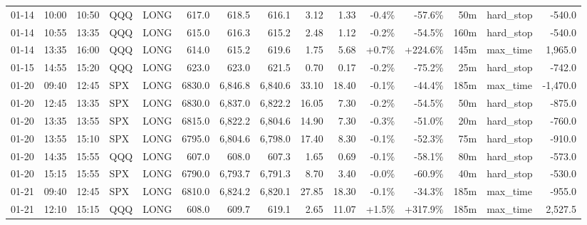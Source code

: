 \documentclass[11pt,a4paper,twoside]{article}
\begin{document}
\begin{landscape}
\begin{center}
\begin{longtable}{>{\color{txtmain}}l l l l l r r r r r r r r >{\color{txtmain}}l r}
01-14 & 10:00 & 10:50 & QQQ & LONG & 617.0 & 618.5 & 616.1 & 3.12 & 1.33 & \textcolor{lossred}{-0.4\%} & \textcolor{lossred}{-57.6\%} & 50m & hard\_stop & \textcolor{lossred}{-540.0} \\
01-14 & 10:55 & 13:35 & QQQ & LONG & 615.0 & 616.3 & 615.2 & 2.48 & 1.12 & \textcolor{lossred}{-0.2\%} & \textcolor{lossred}{-54.5\%} & 160m & hard\_stop & \textcolor{lossred}{-540.0} \\
01-14 & 13:35 & 16:00 & QQQ & LONG & 614.0 & 615.2 & 619.6 & 1.75 & 5.68 & \textcolor{wingreen}{+0.7\%} & \textcolor{wingreen}{+224.6\%} & 145m & max\_time & \textcolor{wingreen}{1,965.0} \\
01-15 & 14:55 & 15:20 & QQQ & LONG & 623.0 & 623.0 & 621.5 & 0.70 & 0.17 & \textcolor{lossred}{-0.2\%} & \textcolor{lossred}{-75.2\%} & 25m & hard\_stop & \textcolor{lossred}{-742.0} \\
01-20 & 09:40 & 12:45 & SPX & LONG & 6830.0 & 6,846.8 & 6,840.6 & 33.10 & 18.40 & \textcolor{lossred}{-0.1\%} & \textcolor{lossred}{-44.4\%} & 185m & max\_time & \textcolor{lossred}{-1,470.0} \\
01-20 & 12:45 & 13:35 & SPX & LONG & 6830.0 & 6,837.0 & 6,822.2 & 16.05 & 7.30 & \textcolor{lossred}{-0.2\%} & \textcolor{lossred}{-54.5\%} & 50m & hard\_stop & \textcolor{lossred}{-875.0} \\
01-20 & 13:35 & 13:55 & SPX & LONG & 6815.0 & 6,822.2 & 6,804.6 & 14.90 & 7.30 & \textcolor{lossred}{-0.3\%} & \textcolor{lossred}{-51.0\%} & 20m & hard\_stop & \textcolor{lossred}{-760.0} \\
01-20 & 13:55 & 15:10 & SPX & LONG & 6795.0 & 6,804.6 & 6,798.0 & 17.40 & 8.30 & \textcolor{lossred}{-0.1\%} & \textcolor{lossred}{-52.3\%} & 75m & hard\_stop & \textcolor{lossred}{-910.0} \\
01-20 & 14:35 & 15:55 & QQQ & LONG & 607.0 & 608.0 & 607.3 & 1.65 & 0.69 & \textcolor{lossred}{-0.1\%} & \textcolor{lossred}{-58.1\%} & 80m & hard\_stop & \textcolor{lossred}{-573.0} \\
01-20 & 15:15 & 15:55 & SPX & LONG & 6790.0 & 6,793.7 & 6,791.3 & 8.70 & 3.40 & \textcolor{lossred}{-0.0\%} & \textcolor{lossred}{-60.9\%} & 40m & hard\_stop & \textcolor{lossred}{-530.0} \\
01-21 & 09:40 & 12:45 & SPX & LONG & 6810.0 & 6,824.2 & 6,820.1 & 27.85 & 18.30 & \textcolor{lossred}{-0.1\%} & \textcolor{lossred}{-34.3\%} & 185m & max\_time & \textcolor{lossred}{-955.0} \\
01-21 & 12:10 & 15:15 & QQQ & LONG & 608.0 & 609.7 & 619.1 & 2.65 & 11.07 & \textcolor{wingreen}{+1.5\%} & \textcolor{wingreen}{+317.9\%} & 185m & max\_time & \textcolor{wingreen}{2,527.5} \\

\end{longtable}
\end{center}
\end{landscape}
\end{document}
